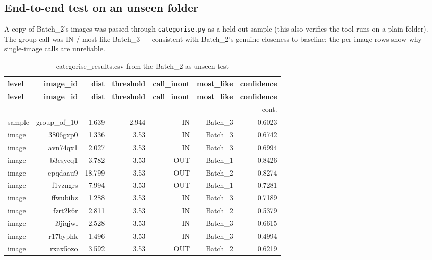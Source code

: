 \documentclass[11pt,a4paper]{article}
\begin{document}
\subsection{End-to-end test on an unseen folder}
A copy of Batch\_2's images was passed through \texttt{categorise.py} as a
held-out sample (this also verifies the tool runs on a plain folder).
The group call was IN / most-like Batch\_3 --- consistent with Batch\_2's
genuine closeness to baseline; the per-image rows show why single-image
calls are unreliable.
\scriptsize
\begin{longtable}{lrrrrrr}
\caption{categorise\_results.csv from the Batch\_2-as-unseen test}\label{tab:unseen}\\
\toprule
\textbf{level} & \textbf{image\_id} & \textbf{dist} & \textbf{threshold} & \textbf{call\_inout} & \textbf{most\_like} & \textbf{confidence} \\
\midrule
\endfirsthead
\toprule \textbf{level} & \textbf{image\_id} & \textbf{dist} & \textbf{threshold} & \textbf{call\_inout} & \textbf{most\_like} & \textbf{confidence} \\
\midrule
\endhead
\midrule\multicolumn{7}{r}{\footnotesize cont.}\\\midrule\endfoot
\bottomrule\endlastfoot
sample & group\_of\_10 & 1.639 & 2.944 & IN & Batch\_3 & 0.6023 \\
image & 3806gxp0 & 1.336 & 3.53 & IN & Batch\_3 & 0.6742 \\
image & avn74qx1 & 2.027 & 3.53 & IN & Batch\_3 & 0.6994 \\
image & b3esycq1 & 3.782 & 3.53 & OUT & Batch\_1 & 0.8426 \\
image & epqdaau9 & 18.799 & 3.53 & OUT & Batch\_2 & 0.8274 \\
image & f1vzngrs & 7.994 & 3.53 & OUT & Batch\_1 & 0.7281 \\
image & ffwubibz & 1.288 & 3.53 & IN & Batch\_3 & 0.7189 \\
image & fzrt2k6r & 2.811 & 3.53 & IN & Batch\_2 & 0.5379 \\
image & i9jiqjwl & 2.528 & 3.53 & IN & Batch\_3 & 0.6615 \\
image & r17byphk & 1.496 & 3.53 & IN & Batch\_3 & 0.4994 \\
image & rxax5ozo & 3.592 & 3.53 & OUT & Batch\_2 & 0.6219 \\
\end{longtable}
\normalsize
\end{document}
